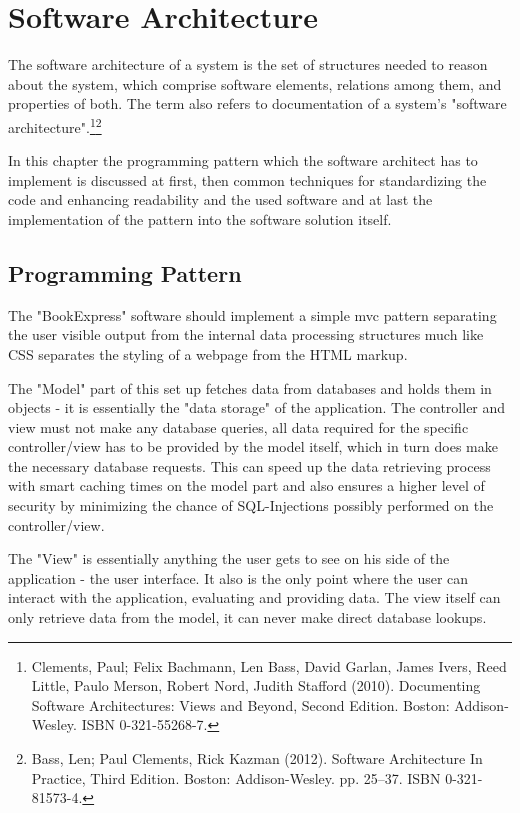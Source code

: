 \documentclass[11pt,a4paper,oneside,svgnames]{report}
\begin{document}
\chapter{Software Architecture}
The software architecture of a system is the set of structures needed to reason about the system, which comprise software elements, relations among them, and properties of both. The term also refers to documentation of a system's "software architecture".\footnote{ Clements, Paul; Felix Bachmann, Len Bass, David Garlan, James Ivers, Reed Little, Paulo Merson, Robert Nord, Judith Stafford (2010). Documenting Software Architectures: Views and Beyond, Second Edition. Boston: Addison-Wesley. ISBN 0-321-55268-7.}\footnote{Bass, Len; Paul Clements, Rick Kazman (2012). Software Architecture In Practice, Third Edition. Boston: Addison-Wesley. pp. 25–37. ISBN 0-321-81573-4.}

In this chapter the programming pattern which the software architect has to implement is discussed at first, then common techniques for standardizing the code and enhancing readability and the used software and at last the implementation of the pattern into the software solution itself.

\section{Programming Pattern}
\label{sec:mvc-pattern}
The "BookExpress" software should implement a simple \gls{mvc} pattern separating the user visible output from the internal data processing structures much like CSS separates the styling of a webpage from the HTML markup.

The "Model" part of this set up fetches data from databases and holds them in objects - it is essentially the "data storage" of the application. The controller and view must not make any database queries, all data required for the specific controller/view has to be provided by the model itself, which in turn does make the necessary database requests. This can speed up the data retrieving process with smart caching times on the model part and also ensures a higher level of security by minimizing the chance of SQL-Injections possibly performed on the controller/view.

The "View" is essentially anything the user gets to see on his side of the application - the user interface. It also is the only point where the user can interact with the application, evaluating and providing data. The view itself can only retrieve data from the model, it can never make direct database lookups.
\end{document}
